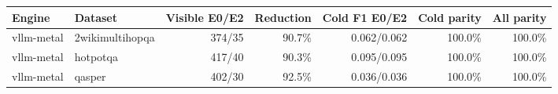 \begin{tabular}{llrrrrr}
\toprule
Engine & Dataset & Visible E0/E2 & Reduction & Cold F1 E0/E2 & Cold parity & All parity \\
\midrule
vllm-metal & 2wikimultihopqa & 374/35 & 90.7\% & 0.062/0.062 & 100.0\% & 100.0\% \\
vllm-metal & hotpotqa & 417/40 & 90.3\% & 0.095/0.095 & 100.0\% & 100.0\% \\
vllm-metal & qasper & 402/30 & 92.5\% & 0.036/0.036 & 100.0\% & 100.0\% \\
\bottomrule
\end{tabular}
